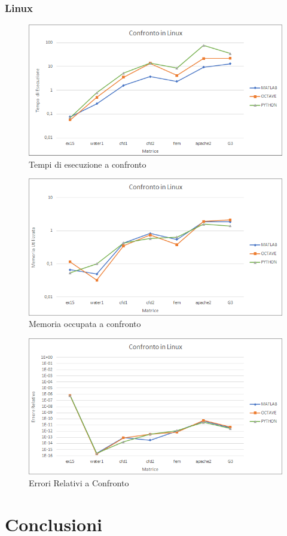 \documentclass[a4paper,12pt,titlepage,oneside]{book}
\begin{document}
        \subsection{Linux}
        \begin{figure}[h]
            \centering
            \includegraphics[scale=0.8]{src/plot/LINUXtime.png}
            \caption{Tempi di esecuzione a confronto}
            \label{plot:timelin}
        \end{figure}
        
        \begin{figure}[h]
            \centering
            \includegraphics[scale=0.8]{src/plot/LINUXmem.png}
            \caption{Memoria occupata a confronto}
            \label{plot:memlin}
        \end{figure}
        
        \begin{figure}[h]
            \centering
            \includegraphics[scale=0.8]{src/plot/LINUXerr.png}
            \caption{Errori Relativi a Confronto}
            \label{plot:errlin}
        \end{figure}

\chapter{Conclusioni}

\nocite{*}
\printbibliography
\end{document}
